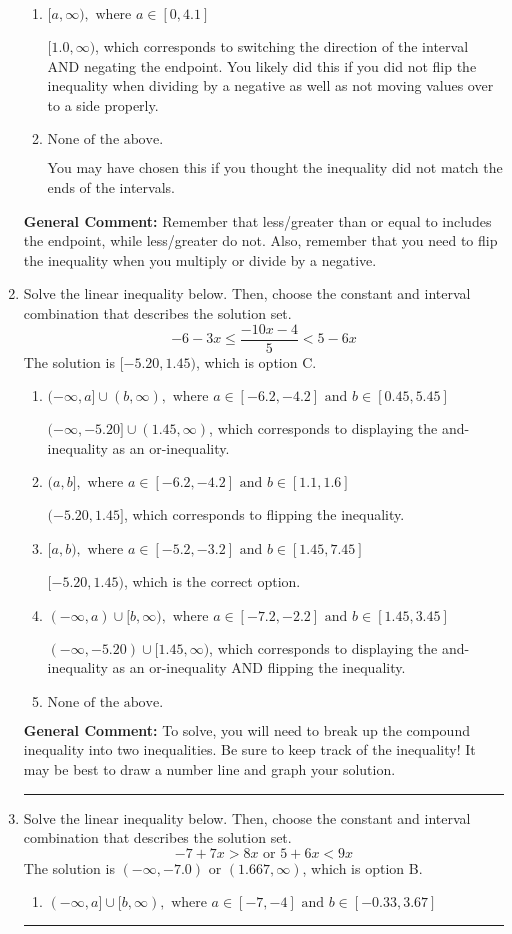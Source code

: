 \documentclass{extbook}[14pt]
\newcommand{\litem}[1]{\item #1

\rule{\textwidth}{0.4pt}}
\begin{document}
\begin{enumerate}
{\begin{enumerate}[label=\Alph*.]
 $(-\infty, 1.0]$, which corresponds to negating the endpoint of the solution.
\item \( [a, \infty), \text{ where } a \in [0, 4.1] \)

 $[1.0, \infty)$, which corresponds to switching the direction of the interval AND negating the endpoint. You likely did this if you did not flip the inequality when dividing by a negative as well as not moving values over to a side properly.
\item \( \text{None of the above}. \)

You may have chosen this if you thought the inequality did not match the ends of the intervals.
\end{enumerate}

\textbf{General Comment:} Remember that less/greater than or equal to includes the endpoint, while less/greater do not. Also, remember that you need to flip the inequality when you multiply or divide by a negative.
}
\litem{
Solve the linear inequality below. Then, choose the constant and interval combination that describes the solution set.
\[ -6 - 3 x \leq \frac{-10 x - 4}{5} < 5 - 6 x \]The solution is \( [-5.20, 1.45) \), which is option C.\begin{enumerate}[label=\Alph*.]
\item \( (-\infty, a] \cup (b, \infty), \text{ where } a \in [-6.2, -4.2] \text{ and } b \in [0.45, 5.45] \)

$(-\infty, -5.20] \cup (1.45, \infty)$, which corresponds to displaying the and-inequality as an or-inequality.
\item \( (a, b], \text{ where } a \in [-6.2, -4.2] \text{ and } b \in [1.1, 1.6] \)

$(-5.20, 1.45]$, which corresponds to flipping the inequality.
\item \( [a, b), \text{ where } a \in [-5.2, -3.2] \text{ and } b \in [1.45, 7.45] \)

$[-5.20, 1.45)$, which is the correct option.
\item \( (-\infty, a) \cup [b, \infty), \text{ where } a \in [-7.2, -2.2] \text{ and } b \in [1.45, 3.45] \)

$(-\infty, -5.20) \cup [1.45, \infty)$, which corresponds to displaying the and-inequality as an or-inequality AND flipping the inequality.
\item \( \text{None of the above.} \)


\end{enumerate}

\textbf{General Comment:} To solve, you will need to break up the compound inequality into two inequalities. Be sure to keep track of the inequality! It may be best to draw a number line and graph your solution.
}
\litem{
Solve the linear inequality below. Then, choose the constant and interval combination that describes the solution set.
\[ -7 + 7 x > 8 x \text{ or } 5 + 6 x < 9 x \]The solution is \( (-\infty, -7.0) \text{ or } (1.667, \infty) \), which is option B.\begin{enumerate}[label=\Alph*.]
\item \( (-\infty, a] \cup [b, \infty), \text{ where } a \in [-7, -4] \text{ and } b \in [-0.33, 3.67] \)


\end{enumerate}}
\end{enumerate}
\end{document}
